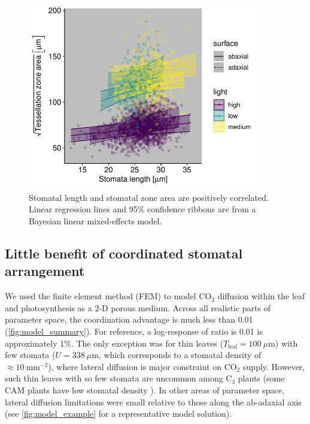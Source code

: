 \documentclass[webpdf,large,modern,unnumsec,namedate]{oup-authoring-template}
\begin{document}
\begin{figure}[ht]
\includegraphics[width = 4in]{figures/length-area.pdf}
\caption{Stomatal length and stomatal zone area are positively correlated. Linear regression lines and 95\% confidence ribbons are from a Bayesian linear mixed-effects model.}
\label{fig:length-area}
\end{figure}

\hypertarget{little-benefit-of-coordinated-stomatal-arrangement}{%
\subsection{Little benefit of coordinated stomatal
arrangement}\label{little-benefit-of-coordinated-stomatal-arrangement}}

We used the finite element method (FEM) to model CO\(_2\) diffusion
within the leaf and photosynthesis as a 2-D porous medium. Across all
realistic parts of parameter space, the coordination advantage is much
less than 0.01 (\autoref{fig:model_summary}). For reference, a
log-response of ratio is 0.01 is approximately 1\%. The only exception
was for thin leaves (\(T_\text{leaf} = 100~\mu \text{m}\)) with few
stomata (\(U = 338~\mu \text{m}\), which corresponds to a stomatal
density of \(\approx 10~\text{mm}^{-2}\)), where lateral diffusion is
major constraint on CO\(_2\) supply. However, such thin leaves with so
few stomata are uncommon among C\(_3\) plants (some CAM plants have low
stomatal density \citep{males_stomatal_2017}). In other areas of
parameter space, lateral diffusion limitations were small relative to
those along the ab-adaxial axis (see \autoref{fig:model_example} for a
representative model solution).
\end{document}
